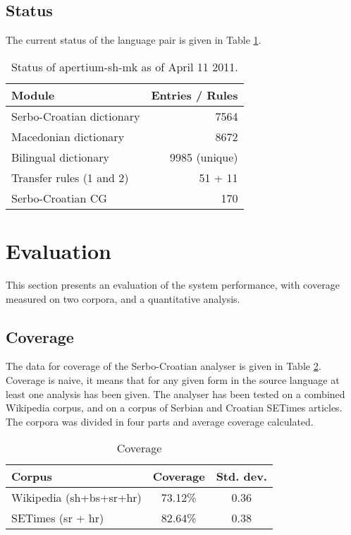 \documentclass{book}
\begin{document}
\subsection*{Status}
The current status of the language pair is given in Table \ref{tab:status}.

\begin{table}
\begin{center}
\caption{Status of apertium-sh-mk as of April 11 2011.}
\label{tab:status}
\begin{tabular}{l|r}
Module & Entries / Rules \\
\hline
Serbo-Croatian dictionary & 7564 \\
Macedonian dictionary & 8672 \\
Bilingual dictionary & 9985 (unique) \\
Transfer rules (1 and 2) & 51 + 11 \\
Serbo-Croatian CG & 170 \\
\hline
\end{tabular}
\end{center}
\end{table}

\section{Evaluation}

This section presents an evaluation of the system performance, with
coverage measured on two corpora, and a quantitative analysis.

\subsection*{Coverage}

The data for coverage of the Serbo-Croatian analyser is 
given in Table \ref{tab:coverage}. Coverage is naive, 
it means that for any given form in the source language at least one analysis
has been given. The analyser has been tested on a combined Wikipedia
corpus, and on a corpus of Serbian and Croatian
SETimes articles. The corpora was divided in four parts and average 
coverage calculated.

\begin{table}
\begin{center}
\caption{Coverage}
\label{tab:coverage}
\begin{tabular}{l|c|c}
Corpus & Coverage & Std. dev. \\
\hline
Wikipedia (sh+bs+sr+hr) & 73.12\% & 0.36 \\
SETimes (sr + hr) & 82.64\% & 0.38 \\
\hline
\end{tabular}
\end{center}
\end{table}
\end{document}
